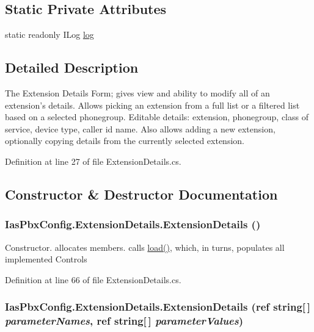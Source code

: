 \subsection*{Static Private Attributes}
\begin{DoxyCompactItemize}
\item 
static readonly ILog \hyperlink{class_ias_pbx_config_1_1_extension_details_ab238f35aaa674eb6fb48a48e5df856ed}{log}
\end{DoxyCompactItemize}


\subsection{Detailed Description}
The Extension Details Form; gives view and ability to modify all of an extension's details. Allows picking an extension from a full list or a filtered list based on a selected phonegroup. Editable details: extension, phonegroup, class of service, device type, caller id name. Also allows adding a new extension, optionally copying details from the currently selected extension. 

Definition at line 27 of file ExtensionDetails.cs.

\subsection{Constructor \& Destructor Documentation}
\hypertarget{class_ias_pbx_config_1_1_extension_details_a88f7f56f7241f0453d991ae96d7e392e}{
\subsubsection[{ExtensionDetails}]{\setlength{\rightskip}{0pt plus 5cm}IasPbxConfig.ExtensionDetails.ExtensionDetails ()}}
\label{class_ias_pbx_config_1_1_extension_details_a88f7f56f7241f0453d991ae96d7e392e}


Constructor. allocates members. calls \hyperlink{class_ias_pbx_config_1_1_extension_details_a9945d9c89ebedaed6d13fadc5bb5ad40}{load()}, which, in turns, populates all implemented Controls 

Definition at line 66 of file ExtensionDetails.cs.\hypertarget{class_ias_pbx_config_1_1_extension_details_ac452ac01cadc7dff15b9eed23b94ba6e}{
\subsubsection[{ExtensionDetails}]{\setlength{\rightskip}{0pt plus 5cm}IasPbxConfig.ExtensionDetails.ExtensionDetails (ref string\mbox{[}$\,$\mbox{]} {\em parameterNames}, \/  ref string\mbox{[}$\,$\mbox{]} {\em parameterValues})}}
\label{class_ias_pbx_config_1_1_extension_details_ac452ac01cadc7dff15b9eed23b94ba6e}


